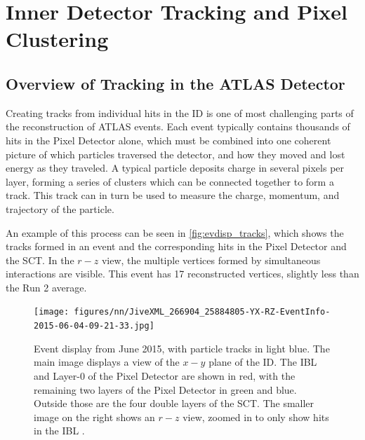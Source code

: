
\chapter{Inner Detector Tracking and Pixel Clustering} %

\label{sec:NN} %



\section{Overview of Tracking in the ATLAS Detector}
\label{sec:tracking}

Creating tracks from individual hits in the \ac{ID} is one of most challenging parts of the reconstruction of \ac{ATLAS} events. Each event typically contains thousands of hits in the Pixel Detector alone, which must be combined into one coherent picture of which particles traversed the detector, and how they moved and lost energy as they traveled. A typical particle deposits charge in several pixels per layer, forming a series of clusters which can be connected together to form a track. This track can in turn be used to measure the charge, momentum, and trajectory of the particle. 

An example of this process can be seen in \autoref{fig:evdisp_tracks}, which shows the tracks formed in an event and the corresponding hits in the Pixel Detector and the \ac{SCT}. In the $r-z$ view, the multiple vertices formed by simultaneous interactions are visible. This event has 17 reconstructed vertices, slightly less than the Run 2 average. 

\begin{centering}
\begin{figure}[bth]
\myfloatalign
\texttt{[image: figures/nn/JiveXML\_266904\_25884805-YX-RZ-EventInfo-2015-06-04-09-21-33.jpg]}
\caption{ Event display from June 2015, with particle tracks in light blue. The main image displays a view of the $x-y$ plane of the \ac{ID}. The \ac{IBL} and Layer-0 of the Pixel Detector are shown in red, with the remaining two layers of the Pixel Detector in green and blue. Outside those are the four double layers of the \ac{SCT}. The smaller image on the right shows an $r-z$ view, zoomed in to only show hits in the \ac{IBL} \cite{Collaboration:2022202}.}
\label{fig:evdisp_tracks}
\end{figure}
\end{centering}

